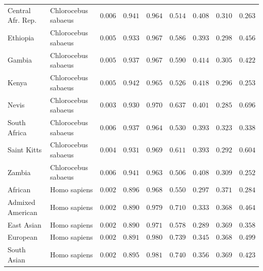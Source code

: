 \documentclass[12pt]{article}
\begin{document}
\begin{center}
\begin{adjustbox}{width=\textwidth}
\begin{tabular}{||l|l|r||r|r||r|r||r|r||}
                \rowcolor{LIGHTGREY} Central Afr. Rep.       & Chlorocebus sabaeus & $ 0.006$ & $ 0.941$ & $ 0.964$ & $ 0.514$ & $ 0.408$ & $ 0.310$ & $ 0.263$ \\
                \rowcolor{LIGHTGREY} Ethiopia        & Chlorocebus sabaeus & $ 0.005$ & $ 0.933$ & $ 0.967$ & $ 0.586$ & $ 0.393$ & $ 0.298$ & $ 0.456$ \\
                \rowcolor{LIGHTGREY} Gambia             & Chlorocebus sabaeus & $ 0.005$ & $ 0.937$ & $ 0.967$ & $ 0.590$ & $ 0.414$ & $ 0.305$ & $ 0.422$ \\
                \rowcolor{LIGHTGREY} Kenya                                 & Chlorocebus sabaeus        & $ 0.005$ & $ 0.942$ & $ 0.965$ & $ 0.526$ & $ 0.418$ & $ 0.296$ & $ 0.253$ \\
                \rowcolor{LIGHTGREY} Nevis                        & Chlorocebus sabaeus        & $ 0.003$ & $ 0.930$ & $ 0.970$ & $ 0.637$ & $ 0.401$ & $ 0.285$ & $ 0.696$ \\
                \rowcolor{LIGHTGREY} South Africa                              & Chlorocebus sabaeus        & $ 0.006$ & $ 0.937$ & $ 0.964$ & $ 0.530$ & $ 0.393$ & $ 0.323$ & $ 0.338$ \\
                \rowcolor{LIGHTGREY} Saint Kitts                                & Chlorocebus sabaeus        & $ 0.004$ & $ 0.931$ & $ 0.969$ & $ 0.611$ & $ 0.393$ & $ 0.292$ & $ 0.604$ \\
                \rowcolor{LIGHTGREY} Zambia                             & Chlorocebus sabaeus        & $ 0.006$ & $ 0.941$ & $ 0.963$ & $ 0.506$ & $ 0.408$ & $ 0.309$ & $ 0.252$ \\
                African                             & Homo sapiens        & $ 0.002$ & $ 0.896$ & $ 0.968$ & $ 0.550$ & $ 0.297$ & $ 0.371$ & $ 0.284$ \\
                Admixed American                             & Homo sapiens        & $ 0.002$ & $ 0.890$ & $ 0.979$ & $ 0.710$ & $ 0.333$ & $ 0.368$ & $ 0.464$ \\
                East Asian                             & Homo sapiens        & $ 0.002$ & $ 0.890$ & $ 0.971$ & $ 0.578$ & $ 0.289$ & $ 0.369$ & $ 0.358$ \\
                European                             & Homo sapiens        & $ 0.002$ & $ 0.891$ & $ 0.980$ & $ 0.739$ & $ 0.345$ & $ 0.368$ & $ 0.499$ \\
                South Asian                             & Homo sapiens        & $ 0.002$ & $ 0.895$ & $ 0.981$ & $ 0.740$ & $ 0.356$ & $ 0.369$ & $ 0.423$ \\
                \bottomrule
            \end{tabular}
        \end{adjustbox}
    \end{center}
\end{document}
